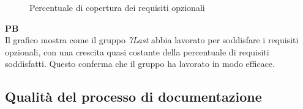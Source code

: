 \begin{figure*}[!h]
    \caption{Percentuale di copertura dei requisiti opzionali}
\end{figure*}

\begin{flushleft}
    \textbf{PB} \\
    Il grafico mostra come il gruppo \textit{7Last} abbia lavorato per soddisfare i requisiti opzionali, con una crescita quasi costante della percentuale di requisiti soddisfatti. Questo conferma che il gruppo ha lavorato in modo efficace. 
\end{flushleft}

\newpage
\subsection{Qualità del processo di documentazione}
